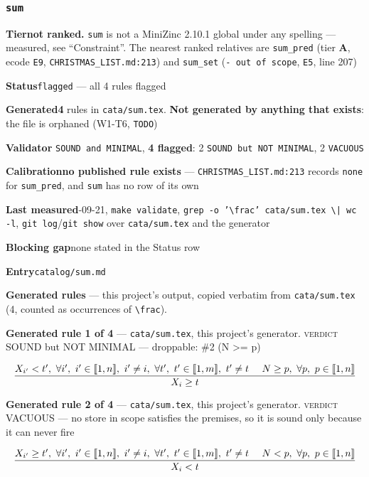 \documentclass[10pt,a4paper]{article}
\newcommand{\entryfield}[2]{{\raggedright\textbf{#1}\quad #2\par}}
\newcommand{\rulebox}[1]{%
  \[\resizebox{\ifdim\width>\linewidth\linewidth\else\width\fi}{!}%
    {$\displaystyle #1$}\]}
\begin{document}
\subsubsection*{\texttt{sum}}
\label{entry:sum}
\entryfield{Tier}{\textbf{not ranked.} \texttt{sum} is not a MiniZinc 2.10.1 global under any spelling --- measured, see ``Constraint''. The nearest ranked relatives are \texttt{sum\_pred} (tier \textbf{A}, ecode \texttt{E9}, \texttt{CHRISTMAS\_LIST.md:213}) and \texttt{sum\_set} (\texttt{- out of scope}, \texttt{E5}, line 207)}
\entryfield{Status}{\texttt{flagged} --- all 4 rules flagged}
\entryfield{Generated}{\textbf{4} rules in \texttt{cata/sum.tex}. \textbf{Not generated by anything that exists}: the file is orphaned (W1-T6, \texttt{TODO})}
\entryfield{Validator}{0 \texttt{SOUND and MINIMAL}, \textbf{4 flagged}: 2 \texttt{SOUND but NOT MINIMAL}, 2 \texttt{VACUOUS}}
\entryfield{Calibration}{\textbf{no published rule exists} --- \texttt{CHRISTMAS\_LIST.md:213} records \texttt{none} for \texttt{sum\_pred}, and \texttt{sum} has no row of its own}
\entryfield{Last measured}{2026-09-21, \texttt{make validate}, \texttt{grep -\allowbreak{}o '\textbackslash{}frac' cata/\allowbreak{}sum.\allowbreak{}tex \textbackslash{}| wc -\allowbreak{}l}, \texttt{git log}/\texttt{git show} over \texttt{cata/sum.tex} and the generator}
\entryfield{Blocking gap}{none stated in the Status row}
\entryfield{Entry}{\texttt{catalog/sum.md}}

\textbf{Generated rules} --- this project's output, copied verbatim from \texttt{cata/sum.tex} (4, counted as occurrences of \texttt{\textbackslash{}frac}).\par

{\small\textbf{Generated rule 1 of 4} --- \texttt{cata/sum.tex}, this project's generator. \textsc{verdict} SOUND but NOT MINIMAL --- droppable: \#2 (N >= p)\par}
\rulebox{\frac{X_{i'}<t',~\forall i',~i' \in \llbracket1,n\rrbracket,~i' \neq i,~\forall t',~t' \in \llbracket1,m\rrbracket,~t' \neq t~~~~N \geq p,~\forall p,~p \in \llbracket1,n\rrbracket}{X_{i} \geq t}}

{\small\textbf{Generated rule 2 of 4} --- \texttt{cata/sum.tex}, this project's generator. \textsc{verdict} VACUOUS --- no store in scope satisfies the premises, so it is sound only because it can never fire\par}
\rulebox{\frac{X_{i'} \geq t',~\forall i',~i' \in \llbracket1,n\rrbracket,~i' \neq i,~\forall t',~t' \in \llbracket1,m\rrbracket,~t' \neq t~~~~N<p,~\forall p,~p \in \llbracket1,n\rrbracket}{X_{i}<t}}
\end{document}
